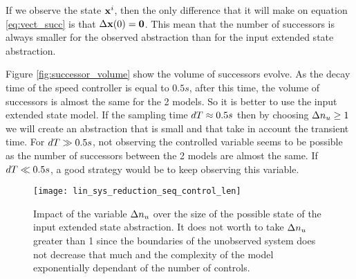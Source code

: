 If we observe the state $ \mathbf{x}^i$, then the only difference that it will make on equation \ref{eq:vect_succ} is that $\Delta  \mathbf{x}(0) =  \mathbf{0}$.
This mean that the number of successors is always smaller for the observed abstraction than for the input extended state abstraction.

Figure \ref{fig:successor_volume} show the volume of successors evolve.
As the decay time of the speed controller is equal to $0.5s$, after this time, the volume of successors is almost the same for the 2 models.
So it is better to use the input extended state model. If the sampling time $dT \approx 0.5s$ then by choosing $\Delta n_u\geq1$ we will create an abstraction that is small and that take in account the transient time. For $dT\gg0.5s$, not observing the controlled variable seems to be possible as the number of successors between the 2 models are almost the same. If $dT \ll 0.5s$, a good strategy would be to keep observing this variable.

\begin{figure}[!ht]
  \centering
  \texttt{[image: lin\_sys\_reduction\_seq\_control\_len]}
  \caption{Impact of the variable $\Delta n_u$ over the size of the possible state of the input extended state abstraction. It does not worth to take $\Delta n_u$ greater than 1 since the boundaries of the unobserved system does not decrease that much and the complexity of the model exponentially dependant of the number of controls.}
  \label{reduced_system_bounds}
\end{figure}

